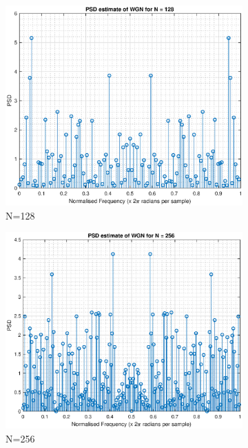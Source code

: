 \documentclass{article}
\begin{document}
\begin{figure}[h!]
\centering
\begin{subfigure}{0.32\textwidth}
\centering
\includegraphics[width = \textwidth]{pgm_128}
\caption{N=128}
\label{fig:pgm_128}
\end{subfigure}
\begin{subfigure}{0.32\textwidth}
\centering
\includegraphics[width = \textwidth]{pgm_256}
\caption{N=256}
\label{fig:pgm_256}
\end{subfigure}
\begin{subfigure}{0.32\textwidth}

\end{subfigure}
\end{figure}
\end{document}
